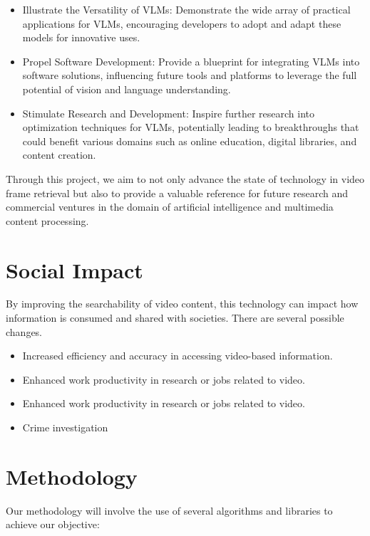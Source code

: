 \documentclass[11pt]{article}
\begin{document}
\begin{itemize}
    \item Illustrate the Versatility of VLMs: Demonstrate the wide array of practical applications for VLMs, encouraging developers to adopt and adapt these models for innovative uses.
    \item Propel Software Development: Provide a blueprint for integrating VLMs into software solutions, influencing future tools and platforms to leverage the full potential of vision and language understanding.
    \item Stimulate Research and Development: Inspire further research into optimization techniques for VLMs, potentially leading to breakthroughs that could benefit various domains such as online education, digital libraries, and content creation.
\end{itemize}

Through this project, we aim to not only advance the state of technology in video frame retrieval but also to provide a valuable reference for future research and commercial ventures in the domain of artificial intelligence and multimedia content processing.

\section{Social Impact}
By improving the searchability of video content, this technology can impact how information is consumed and shared with societies. There are several possible changes.  

\begin{itemize}
    \item Increased efficiency and accuracy in accessing video-based information. 
    \item Enhanced work productivity in research or jobs related to video. 
    \item Enhanced work productivity in research or jobs related to video. 
    \item Crime investigation  
\end{itemize}

\section{Methodology}
Our methodology will involve the use of several algorithms and libraries to achieve our objective: 
\end{document}
